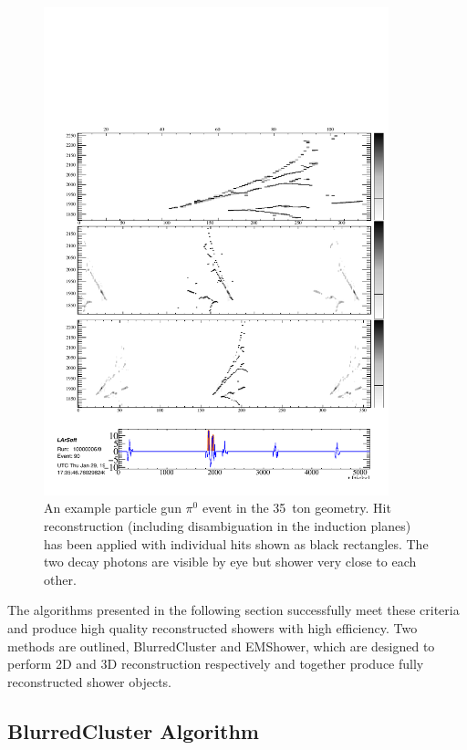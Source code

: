 \begin{figure}
  \centering
  \includegraphics[width=10cm]{EVDPi0Hits.pdf}
  \caption[An example particle gun $\pi^0$ event in the 35~ton geometry.]{An example particle gun $\pi^0$ event in the 35~ton geometry.  Hit reconstruction (including disambiguation in the induction planes) has been applied with individual hits shown as black rectangles.  The two decay photons are visible by eye but shower very close to each other.}
  \label{fig:pi0Showers}
\end{figure}

The algorithms presented in the following section successfully meet these criteria and produce high quality reconstructed showers with high efficiency.  Two methods are outlined, BlurredCluster and EMShower, which are designed to perform 2D and 3D reconstruction respectively and together produce fully reconstructed shower objects.

\subsection{BlurredCluster Algorithm}\label{sec:BlurredCluster}

